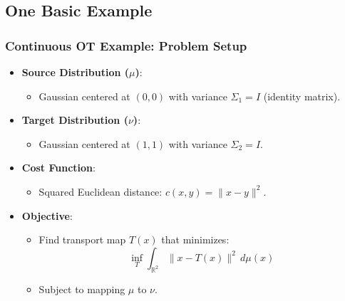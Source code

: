 \documentclass{beamer}
\begin{document}
	\subsection{One Basic Example}
	\begin{frame}
		\frametitle{Continuous OT Example: Problem Setup}
		\begin{itemize}
			\item \textbf{Source Distribution (\(\mu\))}:
			\begin{itemize}
				\item Gaussian centered at \((0, 0)\) with variance \(\Sigma_1 = I\) (identity matrix).
			\end{itemize}
			
			\item \textbf{Target Distribution (\(\nu\))}:
			\begin{itemize}
				\item Gaussian centered at \((1, 1)\) with variance \(\Sigma_2 = I\).
			\end{itemize}
			
			\item \textbf{Cost Function}:
			\begin{itemize}
				\item Squared Euclidean distance: \(c(x, y) = \|x - y\|^2\).
			\end{itemize}
			
			\item \textbf{Objective}:
			\begin{itemize}
				\item Find transport map \(T(x)\) that minimizes:
				\[
				\inf_{T} \int_{\mathbb{R}^2} \|x - T(x)\|^2 \, d\mu(x)
				\]
				\item Subject to mapping \(\mu\) to \(\nu\).
			\end{itemize}
		\end{itemize}
	\end{frame}
	
\end{document}
